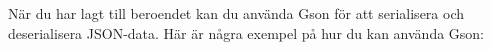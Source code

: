 \hypertarget{cb1}{}
\begin{Shaded}
\begin{Highlighting}[]
\NormalTok{\textless{}}\NormalTok{\textgreater{}}
\NormalTok{    \textless{}}\NormalTok{\textgreater{}}
\NormalTok{        \textless{}}\NormalTok{\textgreater{}}
\NormalTok{        \textless{}}\NormalTok{\textgreater{}}
\NormalTok{        \textless{}}\NormalTok{\textgreater{}}
\NormalTok{    \textless{}/}\NormalTok{\textgreater{}}
\NormalTok{\textless{}/}\NormalTok{\textgreater{}}
\end{Highlighting}
\end{Shaded}

När du har lagt till beroendet kan du använda Gson för att serialisera
och deserialisera JSON-data. Här är några exempel på hur du kan använda
Gson:

